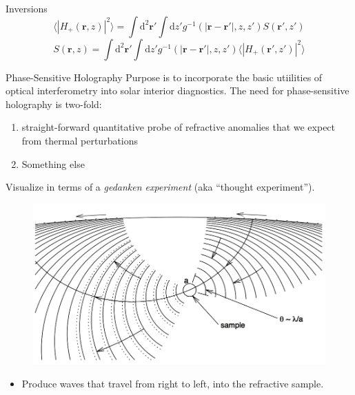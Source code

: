\documentclass{beamer}
\begin{document}
\begin{frame}{Inversions}
    $$ \langle|H_{+}(\mathbf{r},z)|^{2}\rangle =
    \int\textrm{d}^{2}\mathbf{r}'\int\textrm{d}z'g^{-1}
    (|\mathbf{r}-\mathbf{r}'|,z,z')S(\mathbf{r}',z') $$
    $$ S(\mathbf{r},z) = \int\textrm{d}^{2}\mathbf{r}'
        \int\textrm{d}z'g^{-1}(|\mathbf{r}-\mathbf{r}'|,z,z')
        \langle |H_{+}(\mathbf{r}',z')|^{2}  \rangle $$
\end{frame}

\begin{frame}{Phase-Sensitive Holography}
    Purpose is to incorporate the basic utiilities of optical
    interferometry into solar interior diagnostics.
    The need for phase-sensitive holography is two-fold:
    \begin{enumerate}
        \item straight-forward quantitative probe of refractive anomalies
            that we expect from thermal perturbations
        \item Something else
    \end{enumerate}
\end{frame}

\begin{frame}{Visualize in terms of a
    \emph{gedanken experiment} (aka ``thought experiment'').}
    \vspace{-0.25cm}
    \begin{figure}
        \includegraphics[width=\textwidth]{fig_6.png}
    \end{figure}
    \begin{itemize}
        \item Produce waves that travel from right to left, into the
            refractive sample.
    \end{itemize}
\end{frame}
\end{document}
